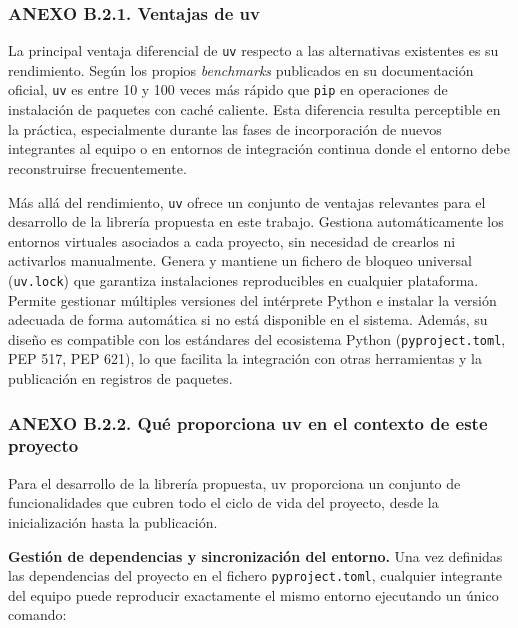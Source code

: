 \subsubsection{ANEXO B.2.1. Ventajas de
uv}\label{anexo-b.2.1.-ventajas-de-uv}

La principal ventaja diferencial de \texttt{uv} respecto a las
alternativas existentes es su rendimiento. Según los propios
\emph{benchmarks} publicados en su documentación oficial, \texttt{uv} es
entre 10 y 100 veces más rápido que \texttt{pip} en operaciones de
instalación de paquetes con caché caliente. Esta diferencia resulta
perceptible en la práctica, especialmente durante las fases de
incorporación de nuevos integrantes al equipo o en entornos de
integración continua donde el entorno debe reconstruirse frecuentemente.

Más allá del rendimiento, \texttt{uv} ofrece un conjunto de ventajas
relevantes para el desarrollo de la librería propuesta en este trabajo.
Gestiona automáticamente los entornos virtuales asociados a cada
proyecto, sin necesidad de crearlos ni activarlos manualmente. Genera y
mantiene un fichero de bloqueo universal (\texttt{uv.lock}) que
garantiza instalaciones reproducibles en cualquier plataforma. Permite
gestionar múltiples versiones del intérprete Python e instalar la
versión adecuada de forma automática si no está disponible en el
sistema. Además, su diseño es compatible con los estándares del
ecosistema Python (\texttt{pyproject.toml}, PEP 517, PEP 621), lo que
facilita la integración con otras herramientas y la publicación en
registros de paquetes.

\subsubsection{ANEXO B.2.2. Qué proporciona uv en el contexto de este
proyecto}\label{anexo-b.2.2.-quuxe9-proporciona-uv-en-el-contexto-de-este-proyecto}

Para el desarrollo de la librería propuesta, uv proporciona un conjunto
de funcionalidades que cubren todo el ciclo de vida del proyecto, desde
la inicialización hasta la publicación.

\textbf{Gestión de dependencias y sincronización del entorno.} Una vez
definidas las dependencias del proyecto en el fichero
\texttt{pyproject.toml}, cualquier integrante del equipo puede
reproducir exactamente el mismo entorno ejecutando un único comando:

\begin{Shaded}
\begin{Highlighting}[]
\end{Highlighting}
\end{Shaded}

